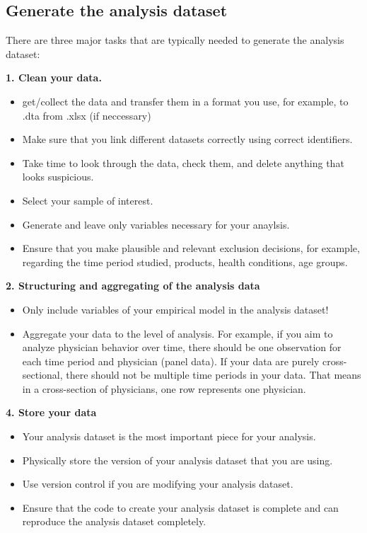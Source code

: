 \documentclass[
]{book}
\providecommand{\tightlist}{%
  \setlength{\itemsep}{0pt}\setlength{\parskip}{0pt}}
\begin{document}
\hypertarget{generate-the-analysis-dataset}{%
\subsection{Generate the analysis
dataset}\label{generate-the-analysis-dataset}}

There are three major tasks that are typically needed to generate the
analysis dataset:

\textbf{1. Clean your data.}

\begin{itemize}
\tightlist
\item
  get/collect the data and transfer them in a format you use, for
  example, to .dta from .xlsx (if neccessary)
\item
  Make sure that you link different datasets correctly using correct
  identifiers.
\item
  Take time to look through the data, check them, and delete anything
  that looks suspicious.
\item
  Select your sample of interest.
\item
  Generate and leave only variables necessary for your anaylsis.
\item
  Ensure that you make plausible and relevant exclusion decisions, for
  example, regarding the time period studied, products, health
  conditions, age groups.
\end{itemize}

\textbf{2. Structuring and aggregating of the analysis data}

\begin{itemize}
\tightlist
\item
  Only include variables of your empirical model in the analysis
  dataset!
\item
  Aggregate your data to the level of analysis. For example, if you aim
  to analyze physician behavior over time, there should be one
  observation for each time period and physician (panel data). If your
  data are purely cross-sectional, there should not be multiple time
  periods in your data. That means in a cross-section of physicians, one
  row represents one physician.
\end{itemize}

\textbf{4. Store your data}

\begin{itemize}
\tightlist
\item
  Your analysis dataset is the most important piece for your analysis.
\item
  Physically store the version of your analysis dataset that you are
  using.
\item
  Use version control if you are modifying your analysis dataset.
\item
  Ensure that the code to create your analysis dataset is complete and
  can reproduce the analysis dataset completely.
\end{itemize}
\end{document}
